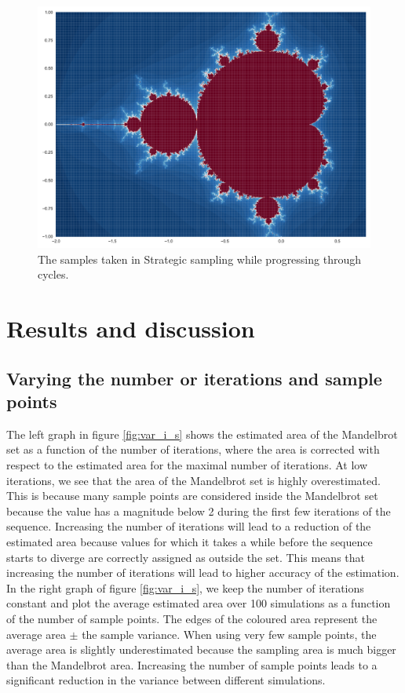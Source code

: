 \documentclass{uva-inf-article}
\begin{document}
\begin{figure}[h]
    \centering
    \includegraphics[width=.85\textwidth]{fractal.pdf}
    \caption{The samples taken in Strategic sampling while progressing through cycles.}
    \label{fig:samples_ss}
\end{figure}


\section{Results and discussion}
\subsection{Varying the number or iterations and sample points}

The left graph in figure \ref{fig:var_i_s} shows the estimated area of the Mandelbrot set as a function of the number of iterations, where the area is corrected with respect to the estimated area for the maximal number of iterations.
At low iterations, we see that the area of the Mandelbrot set is highly overestimated.
This is because many sample points are considered inside the Mandelbrot set because the value has a magnitude below 2 during the first few iterations of the sequence.
Increasing the number of iterations will lead to a reduction of the estimated area because values for which it takes a while before the sequence starts to diverge are correctly assigned as outside the set. 
This means that increasing the number of iterations will lead to higher accuracy of the estimation.\\

In the right graph of figure \ref{fig:var_i_s}, we keep the number of iterations constant and plot the average estimated area over 100 simulations as a function of the number of sample points.
The edges of the coloured area represent the average area $\pm$ the sample variance.
When using very few sample points, the average area is slightly underestimated because the sampling area is much bigger than the Mandelbrot area.
Increasing the number of sample points leads to a significant reduction in the variance between different simulations.
\end{document}
